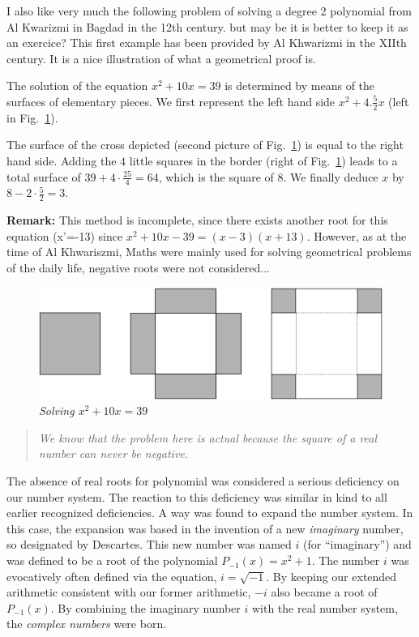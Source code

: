 {\Denis I also like very much the following problem of solving a degree 2 polynomial from Al Kwarizmi in Bagdad in the 12th century.
but may be it is better to keep it as an exercice?}
This first example has been provided by Al Khwarizmi in the XIIth century.
It is a nice illustration of what a geometrical proof is. 
\bigskip

The solution of the equation $x^2 + 10 x = 39$ is determined by means of the surfaces of elementary pieces. 
We first represent the left hand side $x^2 + 4. \frac{5}{2} x$ (left in Fig.~\ref{fig:EquationAlKawarizmi}). 

The surface of the cross depicted (second picture of Fig.~\ref{fig:EquationAlKawarizmi}) is equal to the right hand side. 
Adding the $4$ little squares in the border (right of Fig.~\ref{fig:EquationAlKawarizmi}) leads to a total surface of $39+4 \cdot \frac{25}{4} = 64$, which is the square of $8$.
We finally deduce $x$ by $8-2 \cdot \frac{5}{2} = 3$.

\textbf{Remark:}
This method is incomplete, since there exists another root for this equation (x'=-13) since $x^2 + 10x - 39 = (x-3)(x+13)$. 
However, as at the time of Al Khwariszmi, Maths were mainly used for solving geometrical problems of the daily life,
negative roots were not considered...

\begin{figure}[htb]
\begin{center}
       \includegraphics[scale=0.4]{FiguresArithmetic/EquationElKwarismi}
\caption{{\it Solving $x^2 + 10x = 39$}}
\label{fig:EquationAlKawarizmi}
\end{center}
\end{figure}

\begin{quote}
{\em
We know that the problem here is actual because the square of a real
number can never be negative.
}
\end{quote}
The absence of real roots for polynomial was considered a serious
deficiency on our number system.  The reaction to this deficiency was
similar in kind to all earlier recognized deficiencies.  A way was
found to expand the number system.  In this case, the expansion  was
based in the invention of a new {\it imaginary} number,
so designated by Descartes.  This new number was named $i$
(for ``imaginary'') and was defined to be a root of the polynomial
$P_{-1}(x) = x^2 +1$.  The number $i$ was evocatively often defined
via the equation, $i = \sqrt{-1}$.  By keeping our extended arithmetic
consistent with our former arithmetic, $-i$ also became a root of
$P_{-1}(x)$.  By combining the imaginary number $i$ with the real
number system, the {\it complex numbers} were
born.

